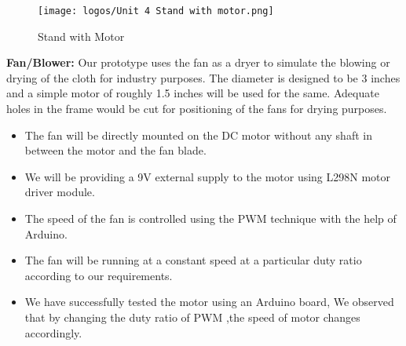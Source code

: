 \documentclass[table,french,english]{rapportCS}
\begin{document}
\begin{figure}[h]
    \centering
    \texttt{[image: logos/Unit 4 Stand with motor.png]}
    \caption{Stand with Motor}
    \label{fig:enter-label}
\end{figure}
\newpage
\vspace{0.8cm}
\textbf{Fan/Blower:} Our prototype uses the fan as a dryer to simulate the blowing or drying of the cloth for industry purposes. The diameter is designed to be 3 inches and a simple motor of roughly 1.5 inches will be used for the same. Adequate holes in the frame would be cut for positioning of the fans for drying purposes.
\begin{itemize}
\item The fan will be directly mounted on the DC motor without any shaft in between the motor and the fan blade.
\item We will be providing a 9V external supply to the motor using L298N motor driver module.
\item The speed of the fan is controlled using the PWM technique with the help of Arduino. 
\item The fan will be running at a constant speed at a particular duty ratio according to our requirements.
\item We have successfully tested the motor using an Arduino board,  We observed that by changing the duty ratio of PWM ,the speed of motor changes accordingly.
\end{itemize}
\end{document}
